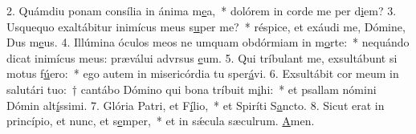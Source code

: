 2. Quámdiu ponam consília in ánima m\uline{e}a,~* dolórem in corde me per d\uline{i}em?
3. Usquequo exaltábitur inimícus meus s\uline{u}per me?~* réspice, et exáudi me, Dómine, Dus m\uline{e}us.
4. Illúmina óculos meos ne umquam obdórmiam in m\uline{o}rte:~* nequándo dicat inimícus meus: præválui advrsus \uline{e}um.
5. Qui tríbulant me, exsultábunt si motus f\uline{ú}ero:~* ego autem in misericórdia tu sper\uline{á}vi.
6. Exsultábit cor meum in salutári tuo:~† cantábo Dómino qui bona tríbuit m\uline{i}hi:~* et psallam nómini Dómin alt\uline{í}ssimi.
7. Glória Patri, et F\uline{í}lio,~* et Spiríti S\uline{a}ncto.
8. Sicut erat in princípio, et nunc, et s\uline{e}mper,~* et in sǽcula sæculrum. \uline{A}men.
